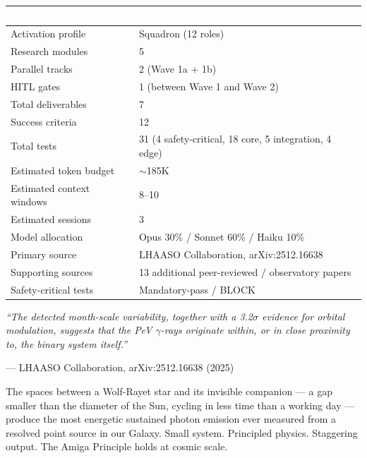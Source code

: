 \documentclass[11pt,letterpaper]{article}
\newcommand{\tableheader}[1]{\textbf{\sffamily\textcolor{white}{#1}}}
\begin{document}
\begin{center}
\begin{tabularx}{\textwidth}{L{5cm}X}
\toprule
{}
\tableheader{Metric} & \tableheader{Value} \\
\midrule
Activation profile & Squadron (12 roles) \\
Research modules & 5 \\
Parallel tracks & 2 (Wave 1a + 1b) \\
HITL gates & 1 (between Wave 1 and Wave 2) \\
Total deliverables & 7 \\
Success criteria & 12 \\
Total tests & 31 (4 safety-critical, 18 core, 5 integration, 4 edge) \\
Estimated token budget & $\sim$185K \\
Estimated context windows & 8--10 \\
Estimated sessions & 3 \\
Model allocation & Opus 30\% / Sonnet 60\% / Haiku 10\% \\
Primary source & LHAASO Collaboration, arXiv:2512.16638 \\
Supporting sources & 13 additional peer-reviewed / observatory papers \\
Safety-critical tests & Mandatory-pass / BLOCK \\
\bottomrule
\end{tabularx}
\end{center}

\vspace{2em}

\begin{quotebox}
\textit{``The detected month-scale variability, together with a 3.2$\sigma$ evidence for orbital modulation, suggests that the PeV $\gamma$-rays originate within, or in close proximity to, the binary system itself.''}

\vspace{0.5em}
\small\sffamily\textcolor{subtlegray}{--- LHAASO Collaboration, arXiv:2512.16638 (2025)}

\vspace{1em}
The spaces between a Wolf-Rayet star and its invisible companion --- a gap smaller than the diameter of the Sun, cycling in less time than a working day --- produce the most energetic sustained photon emission ever measured from a resolved point source in our Galaxy. Small system. Principled physics. Staggering output. The Amiga Principle holds at cosmic scale.
\end{quotebox}
\end{document}
